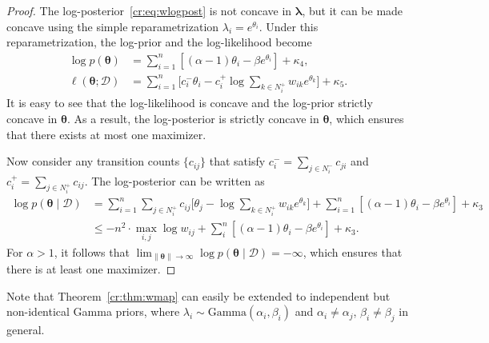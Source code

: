 \begin{proof}
The log-posterior~\eqref{cr:eq:wlogpost} is not concave in $\bm{\lambda}$, but it can be made concave using the simple reparametrization $\lambda_i = e^{\theta_i}$.
Under this reparametrization, the log-prior and the log-likelihood become
\begin{align*}
\log p(\bm{\theta})
    &= \sum_{i = 1}^n \left[ (\alpha - 1) \theta_i - \beta e^{\theta_i} \right] + \kappa_4, \\
\ell(\bm{\theta} ; \mathcal{D})
    &= \sum_{i = 1}^n \bigg[ c^-_i \theta_i - c^+_i \log \sum_{k \in N^+_i} w_{ik} e^{\theta_k} \bigg] + \kappa_5.
\end{align*}
It is easy to see that the log-likelihood is concave and the log-prior strictly concave in $\bm{\theta}$.
As a result, the log-posterior is strictly concave in $\bm{\theta}$, which ensures that there exists at most one maximizer.

Now consider any transition counts $\{ c_{ij} \}$ that satisfy $c^-_i = \sum_{j \in N^-_i} c_{ji}$ and $c^+_i = \sum_{j \in N^+_i} c_{ij}$.
The log-posterior can be written as
\begin{align*}
\log p(\bm{\theta} \mid \mathcal{D})
    &= \sum_{i = 1}^n \sum_{j \in N^+_i} c_{ij} \bigg[ \theta_j - \log \sum_{k \in N^+_i} w_{ik} e^{\theta_k} \bigg]
       + \sum_{i = 1}^n \left[ (\alpha - 1) \theta_i - \beta e^{\theta_i} \right] + \kappa_3\\
    &\le -n^2 \cdot \max_{i,j} \log w_{ij}
       + \sum_i^n \left[ (\alpha - 1) \theta_i - \beta e^{\theta_i} \right] + \kappa_3.
\end{align*}
For $\alpha > 1$, it follows that $\lim_{\lVert \bm{\theta} \rVert \to \infty} \log p(\bm{\theta} \mid \mathcal{D}) = -\infty$, which ensures that there is at least one maximizer.
\end{proof}

Note that Theorem~\ref{cr:thm:wmap} can easily be extended to independent but non-identical Gamma priors, where $\lambda_i \sim \text{Gamma}(\alpha_i, \beta_i)$ and $\alpha_i \ne \alpha_j$, $\beta_i \ne \beta_j$ in general.
